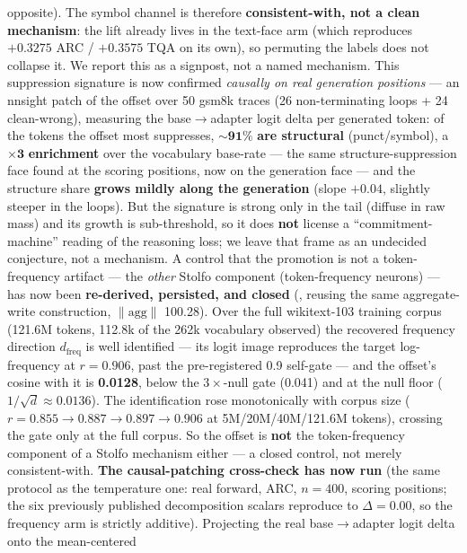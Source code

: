 opposite). The symbol channel is therefore \textbf{consistent-with, not a clean
mechanism}: the lift already lives in the text-face arm (which reproduces $+0.3275$
ARC / $+0.3575$ TQA on its own), so permuting the labels does not collapse it. We
report this as a signpost, not a named mechanism. This suppression signature is now
confirmed \emph{causally on real generation positions} --- an nnsight patch of the
offset over 50 gsm8k traces (26 non-terminating loops + 24 clean-wrong), measuring
the base${\rightarrow}$adapter logit delta per generated token: of the tokens the
offset most suppresses, $\mathbf{{\sim}91\%}$ \textbf{are structural}
(punct/symbol), a $\mathbf{\times3}$ \textbf{enrichment} over the vocabulary
base-rate --- the same structure-suppression face found at the scoring positions,
now on the generation face --- and the structure share \textbf{grows mildly along
the generation} (slope $+0.04$, slightly steeper in the loops). But the signature
is strong only in the tail (diffuse in raw mass) and its growth is sub-threshold,
so it does \textbf{not} license a ``commitment-machine'' reading of the reasoning
loss; we leave that frame as an undecided conjecture, not a mechanism. A control
that the promotion is not a token-frequency artifact --- the \emph{other} Stolfo
component (token-frequency neurons) --- has now been \textbf{re-derived, persisted,
and closed} (, reusing the same aggregate-write
construction, $\|\mathrm{agg}\|$ 100.28). Over the full wikitext-103 training
corpus (121.6M tokens, 112.8k of the 262k vocabulary observed) the recovered
frequency direction $d_{\mathrm{freq}}$ is well identified --- its logit image
reproduces the target log-frequency at $r = \mathbf{0.906}$, past the
pre-registered 0.9 self-gate --- and the offset's cosine with it is
\textbf{0.0128}, below the $3\times$-null gate (0.041) and at the null floor
($1/\sqrt{d} \approx 0.0136$). The identification rose monotonically with corpus
size ($r = 0.855 \rightarrow 0.887 \rightarrow 0.897 \rightarrow \mathbf{0.906}$
at 5M/20M/40M/121.6M tokens), crossing the gate only at the full corpus. So the
offset is \textbf{not} the token-frequency component of a Stolfo mechanism either
--- a closed control, not merely consistent-with. \textbf{The causal-patching
cross-check has now run} (the same protocol as the temperature one: real forward,
ARC, $n{=}400$, scoring positions; the six previously published decomposition
scalars reproduce to $\Delta = 0.00$, so the frequency arm is strictly additive).
Projecting the real base${\rightarrow}$adapter logit delta onto the mean-centered
